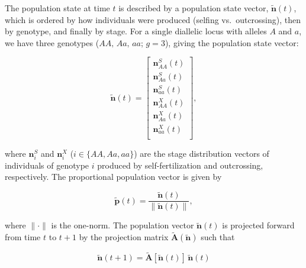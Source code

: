 \documentclass[11pt]{article}
\def\mbf#1{\mathbf{#1}}
\begin{document}
The population state at time $t$ is described by a population state vector, $\tilde{\mbf{n}}(t)$, which is ordered by how individuals were produced (selfing vs.~outcrossing), then by genotype, and finally by stage. For a single diallelic locus with alleles $A$ and $a$, we have three genotypes ($AA,\, Aa,\, aa$; $g = 3$), giving the population state vector:
\begin{linenomath*}
\begin{equation} \label{eq:PopStateVec}
	\tilde{\mbf{n}}(t) =  \left[
								\begin{array}{c}
									\mbf{n}^{S}_{AA}(t) \\
									\mbf{n}^{S}_{Aa}(t) \\
									\mbf{n}^{S}_{aa}(t) \\ \hline
									\mbf{n}^{X}_{AA}(t) \\
									\mbf{n}^{X}_{Aa}(t) \\
									\mbf{n}^{X}_{aa}(t) \\ 
						\end{array} \right],
\end{equation}
\end{linenomath*}

\noindent where $\mbf{n}^{S}_{i}$ and $\mbf{n}^{X}_{i}$ ($i \in \{AA,Aa,aa\}$) are the stage distribution vectors of individuals of genotype $i$ produced by self-fertilization and outcrossing, respectively. The proportional population vector is given by
\begin{linenomath*}
\begin{equation} \label{eq:propPopVec}
	\tilde{\mbf{p}}(t) = \frac{\tilde{\mbf{n}}(t)}{ \| \tilde{\mbf{n}}(t) \|},
\end{equation}
\end{linenomath*}

\noindent where $\| \cdot \|$ is the one-norm. The population vector $\tilde{\mbf{n}}(t)$ is projected forward from time $t$ to $t + 1$ by the projection matrix $\tilde{\mbf{A}}(\tilde{\mbf{n}})$ such that 
\begin{linenomath*}
\begin{equation}
	\tilde{\mbf{n}}(t + 1) = \tilde{\mbf{A}}[\tilde{\mbf{n}}(t)] \, \tilde{\mbf{n}}(t)
\end{equation}
\end{linenomath*}
\end{document}
